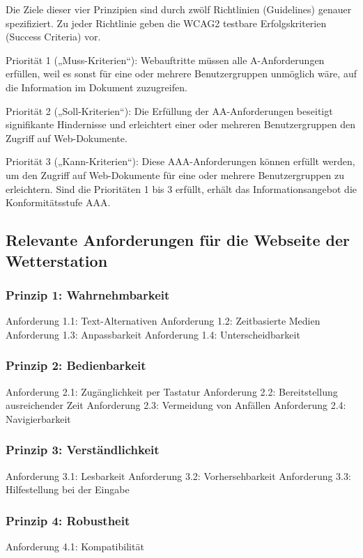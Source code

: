 Die Ziele dieser vier Prinzipien sind durch zwölf Richtlinien (Guidelines) genauer spezifiziert. Zu jeder Richtlinie geben die WCAG2 testbare Erfolgskriterien (Success Criteria) vor.

Priorität 1 („Muss-Kriterien“): Webauftritte müssen alle A-Anforderungen erfüllen, weil es sonst für eine oder mehrere Benutzergruppen unmöglich wäre, auf die Information im Dokument zuzugreifen.

Priorität 2 („Soll-Kriterien“): Die Erfüllung der AA-Anforderungen beseitigt signifikante Hindernisse und erleichtert einer oder mehreren Benutzergruppen den Zugriff auf Web-Dokumente.

Priorität 3 („Kann-Kriterien“): Diese AAA-Anforderungen können erfüllt werden, um den Zugriff auf Web-Dokumente für eine oder mehrere Benutzergruppen zu erleichtern. Sind die Prioritäten 1 bis 3 erfüllt, erhält das Informationsangebot die Konformitätsstufe AAA.

\subsection{Relevante Anforderungen für die Webseite der Wetterstation}

\subsubsection*{Prinzip 1: Wahrnehmbarkeit}
Anforderung 1.1: Text-Alternativen
Anforderung 1.2: Zeitbasierte Medien
Anforderung 1.3: Anpassbarkeit
Anforderung 1.4: Unterscheidbarkeit


\subsubsection*{Prinzip 2: Bedienbarkeit}
Anforderung 2.1: Zugänglichkeit per Tastatur
Anforderung 2.2: Bereitstellung ausreichender Zeit
Anforderung 2.3: Vermeidung von Anfällen
Anforderung 2.4: Navigierbarkeit


\subsubsection*{Prinzip 3: Verständlichkeit}
Anforderung 3.1: Lesbarkeit
Anforderung 3.2: Vorhersehbarkeit
Anforderung 3.3: Hilfestellung bei der Eingabe

\subsubsection*{Prinzip 4: Robustheit}
Anforderung 4.1: Kompatibilität


